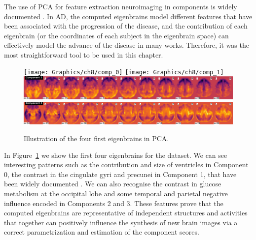 The use of \ac{PCA} for feature extraction neuroimaging in components is widely documented  \cite{Illan2011,Khedher2015,Martinez-Murcia2016book}. In \ac{AD}, the computed eigenbrains model different features that have been associated with the progression of the disease, and the contribution of each eigenbrain (or the coordinates of each subject in the eigenbrain space) can effectively model the advance of the disease in many works. Therefore, it was the most straightforward tool to be used in this chapter.

\begin{figure}[h]
	\centering
	\texttt{[image: Graphics/ch8/comp\_0]}
	\texttt{[image: Graphics/ch8/comp\_1]}
	\includegraphics[width=0.9\linewidth]{Graphics/ch8/comp_2}
	\includegraphics[width=0.9\linewidth]{Graphics/ch8/comp_3}
	\caption{Illustration of the four first eigenbrains in \acs{PCA}.}
	\label{fig:eigenbrainsSyn}
\end{figure}

In Figure~\ref{fig:eigenbrainsSyn} we show the first four eigenbrains for the \adnipet{} dataset. We can see interesting patterns such as the contribution and size of ventricles in Component 0, the contrast in the cingulate gyri and precunei in Component 1, that have been widely documented \cite{Stoeckel04,Illan2011}. We can also recognise the contrast in glucose metabolism at the occipital lobe and some temporal and parietal negative influence encoded in Components 2 and 3. These features prove that the computed eigenbrains are representative of independent structures and activities that together can positively influence the synthesis of new brain images via a correct parametrization and estimation of the component scores. 


